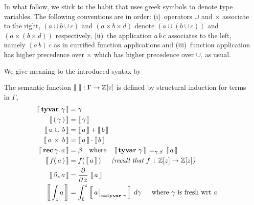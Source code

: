 In what follow, we stick to the habit that uses greek symbols to denote type
variables. The following conventions are in order: (i)~operators $\cup$ and
$\times$ associate to the right, $(a \cup b \cup c)$ and $(a \times b \times
d)$ denote $\left(a \cup (b \cup c)\right)$ and $(a \times (b \times d))$
respectively, (ii)~the application $a\,b\,c$ associates to the left, namely
$(a\,b)\,c$ as in currified function applications and (iii)~function
application has higher precedence over $\times$ which has higher precedence
over $\cup$, as usual.

We give meaning to the introduced syntax by
\begin{definition}[Semantic]
The semantic function $\left\llbracket\,\,\right\rrbracket: \Gamma \rightarrow
\mathbb{Z}[z]$ is defined by structural induction for terms in $\Gamma$,
\begin{displaymath}
\begin{split}
    \semantic{\tyvar{\gamma}} &= \gamma \\
    \semantic{\typarens{\gamma}} &= \semantic{\gamma}\\
    \semantic{\tydu{a}{b}} &= \semantic{a} + \semantic{b} \\
    \semantic{\tycp{a}{b}} &= \semantic{a}\cdot\semantic{b} \\
    \semantic{\tyrec{\gamma}{a}} &= \beta  \quad\text{where}\quad
        \semantic{\tyvar{\gamma}}\,=_{\gamma,\beta}\,\semantic{a}\\
    \semantic{f(\,a\,)} &= f(\,\semantic{a}\,)\indent\textit{(recall that $f\,:\,\mathbb{Z}[z]\rightarrow\mathbb{Z}[z]$)}\\
    \semantic{\partial_{z}\,a} &= \frac{\partial}{\partial\,z}\,\semantic{a}\\
    \semantic{\int_{z}{a}} &= \int_{0}^{z}{\semantic{a\big|_{z=\tyvar{\gamma}}}\,d\gamma}\indent\text{where $\gamma$ is fresh wrt $a$}\\

\end{split}
\end{displaymath}
\end{definition}
